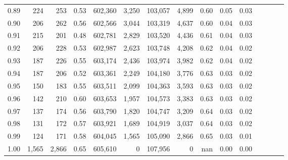 \begin{tabular}{rrrcrrrrrrrrrrr}
0.89 &     224 &    253 &                                       0.53 &  602,360 &    3,250 &  103,057 &    4,899 &  0.60 &  0.05 &                         0.03 \\
0.90 &     206 &    262 &                                       0.56 &  602,566 &    3,044 &  103,319 &    4,637 &  0.60 &  0.04 &                         0.03 \\
0.91 &     215 &    201 &                                       0.48 &  602,781 &    2,829 &  103,520 &    4,436 &  0.61 &  0.04 &                         0.03 \\
0.92 &     206 &    228 &                                       0.53 &  602,987 &    2,623 &  103,748 &    4,208 &  0.62 &  0.04 &                         0.02 \\
0.93 &     187 &    226 &                                       0.55 &  603,174 &    2,436 &  103,974 &    3,982 &  0.62 &  0.04 &                         0.02 \\
0.94 &     187 &    206 &                                       0.52 &  603,361 &    2,249 &  104,180 &    3,776 &  0.63 &  0.03 &                         0.02 \\
0.95 &     150 &    183 &                                       0.55 &  603,511 &    2,099 &  104,363 &    3,593 &  0.63 &  0.03 &                         0.02 \\
0.96 &     142 &    210 &                                       0.60 &  603,653 &    1,957 &  104,573 &    3,383 &  0.63 &  0.03 &                         0.02 \\
0.97 &     137 &    174 &                                       0.56 &  603,790 &    1,820 &  104,747 &    3,209 &  0.64 &  0.03 &                         0.02 \\
0.98 &     131 &    172 &                                       0.57 &  603,921 &    1,689 &  104,919 &    3,037 &  0.64 &  0.03 &                         0.02 \\
0.99 &     124 &    171 &                                       0.58 &  604,045 &    1,565 &  105,090 &    2,866 &  0.65 &  0.03 &                         0.01 \\
1.00 &   1,565 &  2,866 &                                       0.65 &  605,610 &        0 &  107,956 &        0 &   nan &  0.00 &                         0.00 \\
\bottomrule
\end{tabular}
